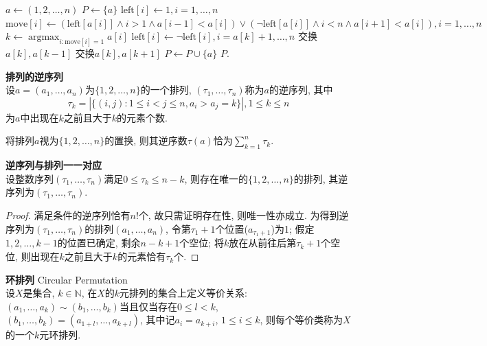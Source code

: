 \begin{algorithm}[ht!]
\caption{生成$\{1,2,\dots,n\}$的所有全排列} 
\label{alg:permutation}
$a \leftarrow (1,2,\dots,n)$\;
$P \leftarrow \{a\}$\;
$\mathrm{left}[i] \leftarrow 1, i=1,\dots,n$\;
{   
    $\mathrm{move}[i] \leftarrow (\mathrm{left}[a[i]] \land i>1 \land a[i-1]<a[i]) \lor (\lnot \mathrm{left}[a[i]] \land i<n \land a[i+1]<a[i]), i=1,\dots,n$\;
    $k \leftarrow \operatorname{\arg\max}_{i: \mathrm{move}[i]=1} a[i]$\;
    $\mathrm{left}[i] \leftarrow \lnot \mathrm{left}[i], i=a[k]+1,\dots,n$\;
    {交换$a[k], a[k-1]$\;}
    {交换$a[k], a[k+1]$\;}
    $P \leftarrow P \cup \{a\}$\;
}
\Return $P$.
\end{algorithm}

\begin{dfn}\textbf{排列的逆序列}\\
设$a=(a_1,\dots,a_n)$为$\{1,2,\dots,n\}$的一个排列, $(\tau_1,\dots, \tau_n)$称为$a$的逆序列, 其中
\begin{equation}
   \tau_k= | \{(i,j) : 1\le i < j \le n,  a_i > a_j = k\} |, 1\le k\le n 
\end{equation}
为$a$中出现在$k$之前且大于$k$的元素个数. 
\end{dfn}

将排列$a$视为$\{1,2,\dots,n\}$的置换, 则其逆序数$\tau(a)$恰为$\sum_{k=1}^n \tau_k$. 

\begin{pro}\textbf{逆序列与排列一一对应}\\
设整数序列$(\tau_1,\dots, \tau_n)$满足$0\le \tau_k \le n-k$, 则存在唯一的$\{1,2,\dots,n\}$的排列, 其逆序列为$(\tau_1,\dots, \tau_n)$. 
\end{pro}
\begin{proof}
满足条件的逆序列恰有$n!$个, 故只需证明存在性, 则唯一性亦成立. 为得到逆序列为$(\tau_1,\dots, \tau_n)$的排列$(a_1,\dots,a_n)$, 令第$\tau_1+1$个位置($a_{\tau_1+1}$)为1; 假定$1,2,\dots,k-1$的位置已确定, 剩余$n-k+1$个空位; 将$k$放在从前往后第$\tau_k+1$个空位, 则出现在$k$之前且大于$k$的元素恰有$\tau_k$个. 
\end{proof}

\begin{dfn} \textbf{环排列} Circular Permutation\\
设$X$是集合, $k\in \mathbb{N}$, 在$X$的$k$元排列的集合上定义等价关系: $(a_1,\dots,a_k)\sim (b_1,\dots,b_k)$当且仅当存在$0\le l < k$, $(b_1,\dots, b_k)=(a_{1+l}, \dots, a_{k+l})$, 其中记$a_i=a_{k+i}$, $1\le i\le k$, 则每个等价类称为$X$的一个$k$元环排列. 
\end{dfn}

